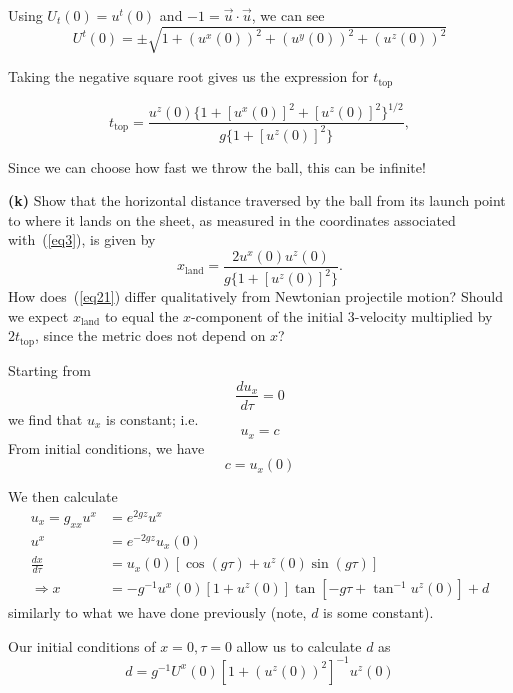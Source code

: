 \documentclass[a4paper]{article} %
\begin{document}
Using $U_{t}(0)=u^t(0)$ and $-1=\vec{u}\cdot \vec{u}$, we can see
\begin{equation}
U^{t}(0)=\pm\sqrt{1+(u^x(0))^2+(u^y(0))^2+(u^z(0))^2}
\end{equation}

Taking the negative square root gives us the expression for $t_{\text{top}}$

\begin{equation}
t_{\text{top}}=\frac{u^z(0)\{1+[u^x(0)]^2+[u^z(0)]^2\}^{1/2}}{g\{1+[u^z(0)]^2\}},
\end{equation}

Since we can choose how fast we throw the ball, this can be infinite!

\begin{framed}
\textbf{(k)} Show that the horizontal distance traversed by the ball from its launch point to where it lands on the sheet, as measured in the coordinates associated with~(\ref{eq3}), is given by
\begin{equation}
x_{\text{land}}=\frac{2u^x(0)u^z(0)}{g\{1+[u^z(0)]^2\}}.\label{eq21}
\end{equation}
How does~(\ref{eq21}) differ qualitatively from Newtonian projectile motion? Should we expect $x_{\text{land}}$ to equal the $x$-component of the initial 3-velocity multiplied by $2t_{\text{top}}$,
since the metric does not depend on $x$?
\end{framed}

Starting from
\begin{equation}
\frac{du_x}{d\tau}=0
\end{equation}
we find that $u_x$ is constant; i.e.
\begin{equation}
 u_x=c
\end{equation}
From initial conditions, we have
\begin{equation}
c=u_x (0)
\end{equation}

We then calculate
\begin{align}
u_x =g_{xx}u^x &= e^{2gz}u^x\\
u^x &= e^{-2gz}u_x(0)\\
\frac{dx}{d\tau}&=u_x(0)\left[\cos(g\tau)+u^z(0)\sin(g\tau)\right]\\
\Rightarrow x&=  -g^{-1}u^x(0)\left[1+u^z(0)\right]\tan\left[-g\tau + \tan^{-1}u^z(0)\right] + d
\end{align}
similarly to what we have done previously (note, $d$ is some constant).

Our initial conditions of $x=0,\tau=0$ allow us to calculate $d$ as
\begin{equation}
d=g^{-1}U^x(0)\left[1+(u^z(0))^2\right]^{-1}u^z(0)
\end{equation}
\end{document}
